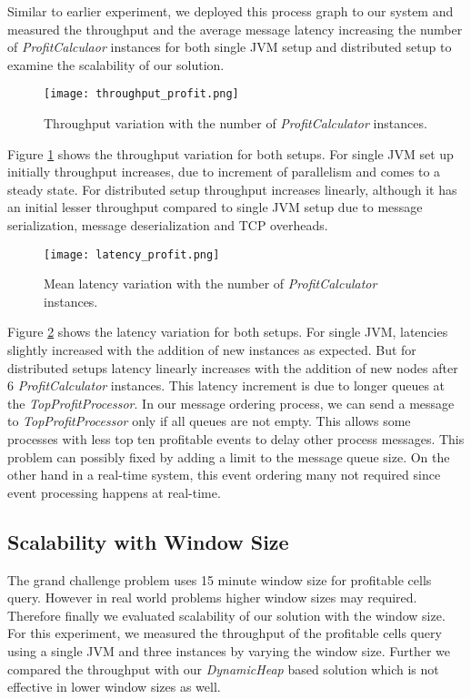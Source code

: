 Similar to earlier experiment,  we deployed this process graph to our system and measured the throughput and the average message latency increasing the number of  \textit{ProfitCalculaor} instances for both single JVM setup and distributed setup to examine the scalability of our solution.

\begin{figure}[!t]
        \centering
        \texttt{[image: throughput\_profit.png]}
        \caption{Throughput variation with the number of \textit{ProfitCalculator} instances.}
        \label{throughput_profit}
\end{figure}
 
Figure \ref{throughput_profit} shows the throughput variation for both setups. For single JVM set up initially throughput increases, due to increment of parallelism and comes to a steady state. For distributed setup  throughput increases linearly, although it has an initial lesser throughput compared to single JVM setup due to message serialization, message deserialization and TCP overheads. 

\begin{figure}[!t]
        \centering
        \texttt{[image: latency\_profit.png]}
        \caption{Mean latency variation with the number of \textit{ProfitCalculator} instances.}
        \label{latency_profit}
\end{figure}

Figure \ref{latency_profit} shows the latency variation for both setups. For single JVM, latencies slightly increased with the addition of new instances as expected. But for distributed setups latency linearly increases with the addition of new nodes after 6 \textit{ProfitCalculator} instances. This latency increment is due to longer queues at the \textit{TopProfitProcessor}. In our message ordering process, we can send a message to \textit{TopProfitProcessor} only if all queues are not empty. This allows some processes with less top ten profitable events to delay other process messages. This problem can  possibly fixed by adding a limit to the message queue size. On the other hand in a real-time system, this event ordering many not required since event processing happens at real-time.

\subsection{Scalability with Window Size}

The grand challenge problem uses 15 minute window size for profitable cells query. However in real world problems higher window sizes may required. Therefore finally we evaluated scalability of our solution with the window size.  For this experiment, we measured the throughput of the profitable cells query using a single JVM and three instances by varying the window size. Further we compared the throughput with our \textit{DynamicHeap} based solution which is not effective in lower window sizes as well.

